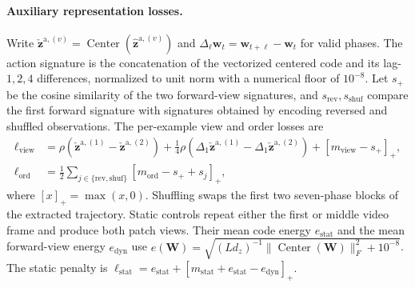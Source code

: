 \paragraph{Auxiliary representation losses.}
Write $\check{\mathbf z}^{\mathrm a,(v)}=\operatorname{Center}(\widehat{\mathbf z}^{\mathrm a,(v)})$ and
$\Delta_\ell\mathbf w_t=\mathbf w_{t+\ell}-\mathbf w_t$ for valid phases. The action signature is
the concatenation of the vectorized centered code and its lag-$1,2,4$
differences, normalized to unit norm with a numerical floor of $10^{-8}$.
Let $s_+$ be the cosine similarity of the two forward-view signatures,
and $s_{\mathrm{rev}},s_{\mathrm{shuf}}$ compare the first forward signature
with signatures obtained by encoding reversed and shuffled observations.
The per-example view and order losses are
\begin{align}
 \ell_{\mathrm{view}}
   &=\rho(\check{\mathbf z}^{\mathrm a,(1)}-\check{\mathbf z}^{\mathrm a,(2)})
     +\tfrac14\rho(\Delta_1\check{\mathbf z}^{\mathrm a,(1)}-\Delta_1\check{\mathbf z}^{\mathrm a,(2)})
     +[m_{\mathrm{view}}-s_+]_+,\nonumber\\
 \ell_{\mathrm{ord}}
   &=\tfrac12\sum_{j\in\{\mathrm{rev},\mathrm{shuf}\}}
       [m_{\mathrm{ord}}-s_++s_j]_+,
 \label{eq:impl-view-order-loss}
\end{align}
where $[x]_+=\max(x,0)$. Shuffling swaps the first two seven-phase blocks
of the extracted trajectory. Static controls repeat either the first or
middle video frame and produce both patch views. Their mean code energy
$e_{\mathrm{stat}}$ and the mean forward-view energy $e_{\mathrm{dyn}}$
use $e(\mathbf W)=\sqrt{(Ld_z)^{-1}\|\operatorname{Center}(\mathbf W)\|_F^2+10^{-8}}$.
The static penalty is
$\ell_{\mathrm{stat}}=e_{\mathrm{stat}}+
[m_{\mathrm{stat}}+e_{\mathrm{stat}}-e_{\mathrm{dyn}}]_+$.

